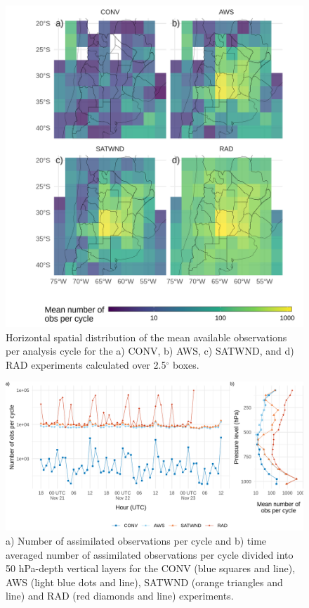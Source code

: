 \documentclass[authoryear,preprint,review,12pt]{elsarticle} %
\begin{document}
\begin{figure}
\includegraphics[width=1\linewidth]{../figures/obs-horizontal-1} \caption{Horizontal spatial distribution of the mean available observations per analysis cycle for the a) CONV, b) AWS, c) SATWND, and d) RAD experiments calculated over 2.5\(^{\circ}\) boxes.}\label{fig:obs-horizontal}
\end{figure}



\begin{figure}
\includegraphics{../figures/obs-cycle-1} \caption{a) Number of assimilated observations per cycle and b) time averaged number of assimilated observations per cycle divided into 50 hPa-depth vertical layers for the CONV (blue squares and line), AWS (light blue dots and line), SATWND (orange triangles and line) and RAD (red diamonds and line) experiments.}\label{fig:obs-cycle}
\end{figure}
\end{document}
